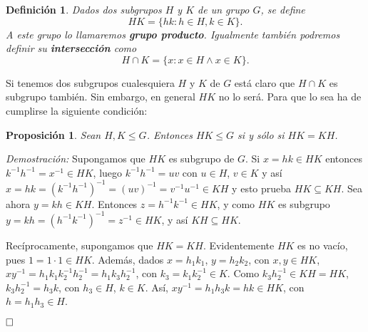 \documentclass[12pt]{article}
\newtheorem{proposition}[theorem]{Proposición}
\newtheorem{definition}[theorem]{Definición}
\begin{document}
\begin{definition} Dados dos subgrupos $H$ y $K$ de un grupo $G$, se define $$HK = \lbrace hk : h \in H, k \in K \rbrace.$$ A este grupo lo llamaremos \textbf{grupo producto}. Igualmente también podremos definir su \textbf{intersección} como
$$H \cap K = \lbrace x: x\in H \wedge x \in K \rbrace.$$
\end{definition}

Si tenemos dos subgrupos cualesquiera $H$ y $K$ de $G$ está claro que $H \cap K$ es subgrupo también. Sin embargo, en general $HK$ no lo será. Para que lo sea ha de cumplirse la siguiente condición:

\begin{proposition}\label{eq:progruesgru} Sean $H,K \leq G$. Entonces $HK \leq G$ si y sólo si $HK = KH$.
\end{proposition}
\emph{Demostración: }Supongamos que $HK$ es subgrupo de $G$. Si $x = hk \in HK$ entonces $k^{-1}h^{-1} = x^{-1} \in HK$, luego $k^{-1}h^{-1} = uv$ con $u \in H$, $v \in K$ y así $x = hk = (k^{-1}h^{-1})^{-1} = (uv)^{-1} = v^{-1}u^{-1} \in KH$ y esto prueba $HK \subseteq KH$. Sea ahora $y = kh \in KH$. Entonces $z = h^{-1}k^{-1} \in HK$, y como $HK$ es subgrupo $y = kh = (h^{-1}k^{-1})^{-1} = z^{-1} \in HK$, y así $KH \subseteq HK$.
 
Recíprocamente, supongamos que $HK = KH$. Evidentemente $HK$ es no vacío, pues $1 = 1 \cdot 1 \in HK$. Además, dados $x = h_{1}k_{1}$, $y = h_{2}k_{2}$, con $x,y \in HK$, $xy^{-1} = h_{1}k_{1}k_{2}^{-1}h_{2}^{-1} = h_{1}k_{3}h_{2}^{-1}$, con $k_{3} = k_{1}k_{2}^{-1} \in K$. Como $k_{3}h_{2}^{-1} \in KH = HK$, $k_{3}h_{2}^{-1} = h_{3}k$, con $h_{3} \in H$, $k \in K$. Así, $xy^{-1} = h_{1}h_{3}k = hk \in HK$, con $h = h_{1}h_{3} \in H$.

$\hfill \square$
\end{document}

